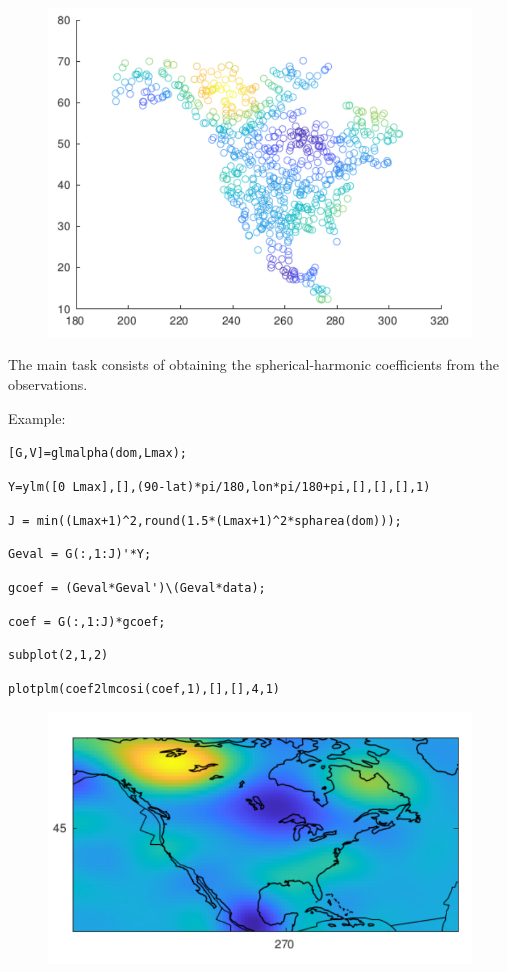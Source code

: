 \documentclass{article}
\begin{document}
\begin{figure}[H]
\includegraphics[scale=.75]{namerica_randomdata}
\end{figure}

\setlength{\parskip}{0.5cm plus4mm minus3mm}

The main task consists of obtaining the spherical-harmonic coefficients from the observations.

Example:

\vspace{3mm}

\setlength{\parskip}{.1mm}

\verb![G,V]=glmalpha(dom,Lmax);!

\verb!Y=ylm([0 Lmax],[],(90-lat)*pi/180,lon*pi/180+pi,[],[],[],1)!

\verb!J = min((Lmax+1)^2,round(1.5*(Lmax+1)^2*spharea(dom)));!

\verb!Geval = G(:,1:J)'*Y;!

\verb!gcoef = (Geval*Geval')\(Geval*data);!

\verb!coef = G(:,1:J)*gcoef;!

\verb!subplot(2,1,2)!

\verb!plotplm(coef2lmcosi(coef,1),[],[],4,1)!

\begin{figure}[H]
\includegraphics[scale=.75]{namerica_solvedcoefficients}
\end{figure}
\end{document}
